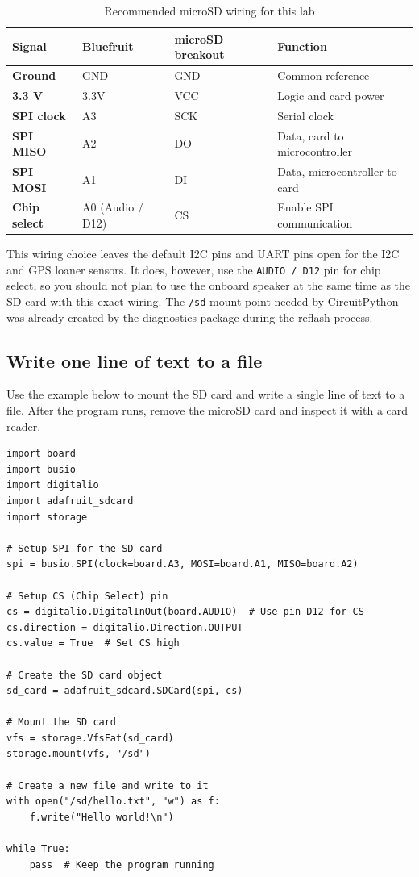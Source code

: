 \documentclass[11pt]{article}
\newcommand{\kit}[1]{\texttt{#1}}
\begin{document}
\begin{table}[H]
\centering
\caption{Recommended microSD wiring for this lab}\label{table:microsd}
\renewcommand{\arraystretch}{1.25}
\begin{tabular}{>{\bfseries}p{1in} p{1.2in} p{1.5in} p{2.1in}}
\toprule
Signal & Bluefruit & microSD breakout & Function \\
\midrule
Ground & GND & GND & Common reference \\
3.3 V & 3.3V & VCC & Logic and card power \\
SPI clock & A3 & SCK & Serial clock \\
SPI MISO & A2 & DO & Data, card to microcontroller \\
SPI MOSI & A1 & DI & Data, microcontroller to card \\
Chip select & A0 (Audio / D12) & CS & Enable SPI communication \\
\bottomrule
\end{tabular}
\end{table}

\begin{notebox}
This wiring choice leaves the default I2C pins and UART pins open for the I2C and GPS loaner sensors. It does, however, use the \kit{AUDIO / D12} pin for chip select, so you should not plan to use the onboard speaker at the same time as the SD card with this exact wiring. The \kit{/sd} mount point needed by CircuitPython was already created by the diagnostics package during the reflash process.
\end{notebox}

\subsection{Write one line of text to a file}
Use the example below to mount the SD card and write a single line of text to a file. After the program runs, remove the microSD card and inspect it with a card reader.

\begin{lstlisting}
import board
import busio
import digitalio
import adafruit_sdcard
import storage

# Setup SPI for the SD card
spi = busio.SPI(clock=board.A3, MOSI=board.A1, MISO=board.A2)

# Setup CS (Chip Select) pin
cs = digitalio.DigitalInOut(board.AUDIO)  # Use pin D12 for CS
cs.direction = digitalio.Direction.OUTPUT
cs.value = True  # Set CS high

# Create the SD card object
sd_card = adafruit_sdcard.SDCard(spi, cs)

# Mount the SD card
vfs = storage.VfsFat(sd_card)
storage.mount(vfs, "/sd")

# Create a new file and write to it
with open("/sd/hello.txt", "w") as f:
    f.write("Hello world!\n")

while True:
    pass  # Keep the program running
\end{lstlisting}
\end{document}

